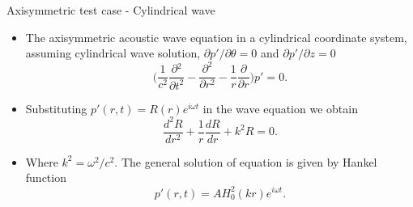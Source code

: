 \documentclass[10pt, aspectratio=169]{beamer}
\begin{document}
\begin{frame}{Axisymmetric test case - Cylindrical wave}
	\begin{itemize}
		\item The axisymmetric acoustic wave equation in a cylindrical coordinate system, assuming cylindrical wave solution, $\partial p'/\partial \theta = 0$ and $\partial p'/\partial z = 0$
		\begin{equation}\label{Cylindrical wave equation}
			\Bigg( \frac{1}{c^2}\frac{\partial{}^{2}}{\partial{t}^{2}}- \frac{\partial^2}{\partial r^2} - \frac{1}{r}\frac{\partial}{\partial r}  \Bigg) p' = 0.
		\end{equation}
		\item Substituting $p'(r, t) = R(r)e^{i\omega t}$ in the wave equation we obtain
		\begin{equation}
			\frac{d^2 R}{dr^2} + \frac{1}{r}\frac{dR}{dr} + k^2R = 0.
		\end{equation}
		\item Where $k^2 = {\omega^2}/{c^2}$. The general solution of equation is given by Hankel function
		\begin{equation}
			p'(r, t) = AH_{0}^2(kr)e^{i\omega t}.
		\end{equation}
	\end{itemize}
\end{frame}
\end{document}
